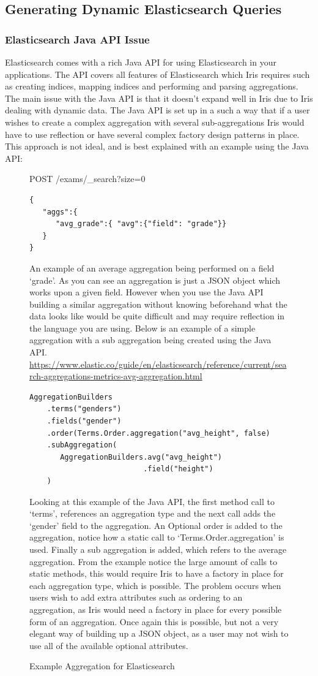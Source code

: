 \documentclass[12pt,a4paper,titlepage]{report}
\begin{document}
\subsection{Generating Dynamic Elasticsearch Queries}
\subsubsection{Elasticsearch Java API Issue}
Elasticsearch comes with a rich Java API for using Elasticsearch in your applications. The API covers all features of Elasticsearch which Iris requires such as creating indices, mapping indices and performing and parsing aggregations. The main issue with the Java API is that it doesn’t expand well in Iris due to Iris dealing with dynamic data. The Java API is set up in a such a way that if a user wishes to create a complex aggregation with several sub-aggregations Iris would have to  use reflection or have several complex factory design patterns in place. This approach is not ideal, and is best explained with an example using the Java API:
\begin{figure}[H]
\begin{tcolorbox}
POST /exams/\_search?size=0
\begin{verbatim}
{
   "aggs":{
      "avg_grade":{ "avg":{"field": "grade"}}
   }
}
\end{verbatim}
An example of an average aggregation being performed on a field ‘grade’. As you can see an aggregation is just a JSON object which works upon a given field.
However when you use the Java API building a similar aggregation without knowing beforehand what the data looks like would be quite difficult and may require reflection in the language you are using. Below is an example of a simple aggregation with a sub aggregation being created using the Java API. \url{https://www.elastic.co/guide/en/elasticsearch/reference/current/search-aggregations-metrics-avg-aggregation.html}

\begin{verbatim}
AggregationBuilders
	.terms("genders")
	.fields("gender")
	.order(Terms.Order.aggregation("avg_height", false)
	.subAggregation(
	   AggregationBuilders.avg("avg_height")
			              .field("height")
	)
\end{verbatim}
Looking at this example of the Java API, the first method call to ‘terms’, references an aggregation type and the next call adds the ‘gender’ field to the aggregation. An Optional order is added to the aggregation, notice how a static call to ‘Terms.Order.aggregation’ is used. Finally a sub aggregation is added, which refers to the average aggregation. From the example notice the large amount of calls to static methods, this would require Iris to have a factory in place for each aggregation type, which is possible. The problem occurs when users wish to add extra attributes such as ordering to an aggregation, as Iris would need a factory in place for every possible form of an aggregation. Once again this is possible, but not a very elegant way of building up a JSON object, as a user may not wish to use all of the available optional attributes.
\end{tcolorbox}
\caption{Example Aggregation for Elasticsearch}
\end{figure}
\end{document}

